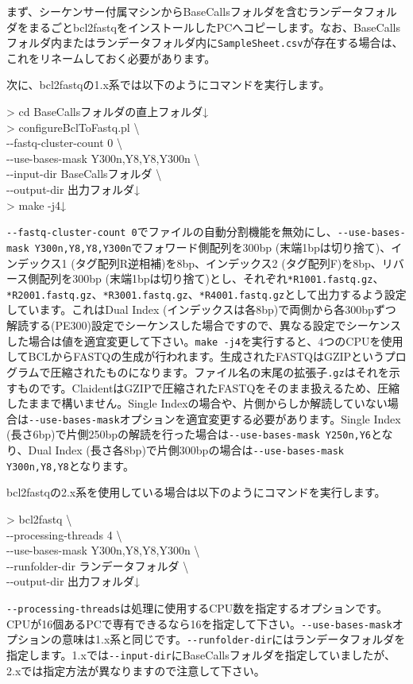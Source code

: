 \documentclass[titlepage,10pt,a4paper]{jsbook}
\newenvironment{cmd}{\begin{oframed}\raggedright\ttfamily\footnotesize\setlength{\baselineskip}{1.4em}}{\end{oframed}\vspace{-1em}}
\begin{document}
まず、シーケンサー付属マシンからBaseCallsフォルダを含むランデータフォルダをまるごとbcl2fastqをインストールしたPCへコピーします。なお、BaseCallsフォルダ内またはランデータフォルダ内に\texttt{SampleSheet.csv}が存在する場合は、これをリネームしておく必要があります。

次に、bcl2fastqの1.x系では以下のようにコマンドを実行します。
\begin{cmd}
{\textgreater} cd BaseCallsフォルダの直上フォルダ↓\\
{\textgreater} configureBclToFastq.pl {\textbackslash}\\
{-}{-}fastq-cluster-count 0 {\textbackslash}\\
{-}{-}use-bases-mask Y300n,Y8,Y8,Y300n {\textbackslash}\\
{-}{-}input-dir BaseCallsフォルダ {\textbackslash}\\
{-}{-}output-dir 出力フォルダ↓\\
{\textgreater} make -j4↓
\end{cmd}
\texttt{{-}{-}fastq-cluster-count 0}でファイルの自動分割機能を無効にし、\texttt{{-}{-}use-bases-mask Y300n,Y8,Y8,Y300n}でフォワード側配列を300bp (末端1bpは切り捨て)、インデックス1 (タグ配列R逆相補)を8bp、インデックス2 (タグ配列F)を8bp、リバース側配列を300bp (末端1bpは切り捨て)とし、それぞれ\texttt{*{\textunderscore}R1{\textunderscore}001.fastq.gz}、\texttt{*{\textunderscore}R2{\textunderscore}001.fastq.gz}、\texttt{*{\textunderscore}R3{\textunderscore}001.fastq.gz}、\texttt{*{\textunderscore}R4{\textunderscore}001.fastq.gz}として出力するよう設定しています。これはDual Index (インデックスは各8bp)で両側から各300bpずつ解読する(PE300)設定でシーケンスした場合ですので、異なる設定でシーケンスした場合は値を適宜変更して下さい。\texttt{make -j4}を実行すると、4つのCPUを使用してBCLからFASTQの生成が行われます。生成されたFASTQはGZIPというプログラムで圧縮されたものになります。ファイル名の末尾の拡張子\texttt{.gz}はそれを示すものです。ClaidentはGZIPで圧縮されたFASTQをそのまま扱えるため、圧縮したままで構いません。Single Indexの場合や、片側からしか解読していない場合は\texttt{{-}{-}use-bases-mask}オプションを適宜変更する必要があります。Single Index (長さ6bp)で片側250bpの解読を行った場合は\texttt{{-}{-}use-bases-mask Y250n,Y6}となり、Dual Index (長さ各8bp)で片側300bpの場合は\texttt{{-}{-}use-bases-mask Y300n,Y8,Y8}となります。

bcl2fastqの2.x系を使用している場合は以下のようにコマンドを実行します。
\begin{cmd}
{\textgreater} bcl2fastq {\textbackslash}\\
{-}{-}processing-threads 4 {\textbackslash}\\
{-}{-}use-bases-mask Y300n,Y8,Y8,Y300n {\textbackslash}\\
{-}{-}runfolder-dir ランデータフォルダ {\textbackslash}\\
{-}{-}output-dir 出力フォルダ↓
\end{cmd}
\texttt{{-}{-}processing-threads}は処理に使用するCPU数を指定するオプションです。CPUが16個あるPCで専有できるなら16を指定して下さい。\texttt{{-}{-}use-bases-mask}オプションの意味は1.x系と同じです。\texttt{{-}{-}runfolder-dir}にはランデータフォルダを指定します。1.xでは\texttt{{-}{-}input-dir}にBaseCallsフォルダを指定していましたが、2.xでは指定方法が異なりますので注意して下さい。
\end{document}

